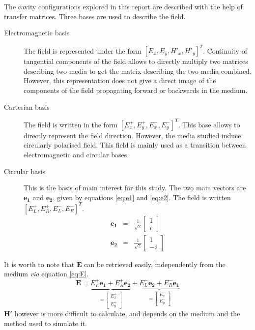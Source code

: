 The cavity configurations explored in this report are described with the help of transfer matrices. Three bases are used to describe the field.
\begin{description}
	\item[Electromagnetic basis] The field is represented under the form $\left[E_x, E_y, H'_x, H'_y\right]^T$. Continuity of tangential components of the field allows to directly multiply two matrices describing two media to get the matrix describing the two media combined. However, this representation does not give a direct image of the components of the field propagating forward or backwards in the medium.
	\item[Cartesian basis] The field is written in the form $\left[E_x^+, E_y^+, E_x^-, E_y^-\right]^T$. This base allows to directly represent the field direction. However, the media studied induce circularly polarised field. This field is mainly used as a transition between electromagnetic and circular bases.
	\item[Circular basis] This is the basis of main interest for this study. The two main vectors are $\bm{e_1}$ and $\bm{e_2}$, given by equations \ref{eq:e1} and \ref{eq:e2}. The field is written $\left[E_L^+, E_R^+, E_L^-, E_R^-\right]^T$.
	\begin{eqnarray}
	\bm{e_1} &=& \frac{1}{\sqrt{2}}\begin{bmatrix}
	1\\i
	\end{bmatrix}\label{eq:e1}\\
	\bm{e_2} &=& \frac{1}{\sqrt{2}}\begin{bmatrix}
	1\\-i
	\end{bmatrix}\label{eq:e2}
	\end{eqnarray}
\end{description}
%
It is worth to note that $\bm{E}$ can be retrieved easily, independently from the medium \textit{via} equation \ref{eq:E}.
\begin{equation}
\bm{E} = \underbrace{E_L^+\bm{e_1}+E_R^+\bm{e_2}}_{=\begin{bmatrix}E_x^+\\E_y^+\end{bmatrix}}+\underbrace{E_L^-\bm{e_2}+E_R^-\bm{e_1}}_{=\begin{bmatrix}E_x^-\\E_y^-\end{bmatrix}}\label{eq:E}
\end{equation}
%
$\bm{H'}$ however is more difficult to calculate, and depends on the medium and the method used to simulate it.

